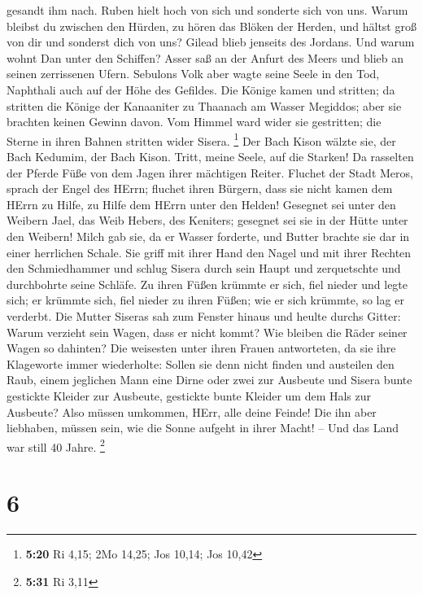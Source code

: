 gesandt ihm nach. Ruben hielt hoch von sich und sonderte sich von uns.
 Warum bleibst du zwischen den Hürden, zu hören das Blöken
der Herden, und hältst groß von dir und sonderst dich von uns?
 Gilead blieb jenseits des Jordans. Und warum wohnt Dan
unter den Schiffen? Asser saß an der Anfurt des Meers und blieb an
seinen zerrissenen Ufern.  Sebulons Volk aber wagte seine
Seele in den Tod, Naphthali auch auf der Höhe des Gefildes.
 Die Könige kamen und stritten; da stritten die Könige der
Kanaaniter zu Thaanach am Wasser Megiddos; aber sie brachten keinen
Gewinn davon.  Vom Himmel ward wider sie gestritten; die
Sterne in ihren Bahnen stritten wider Sisera. \footnote{\textbf{5:20} Ri
  4,15; 2Mo 14,25; Jos 10,14; Jos 10,42}  Der Bach Kison
wälzte sie, der Bach Kedumim, der Bach Kison. Tritt, meine Seele, auf
die Starken!  Da rasselten der Pferde Füße von dem Jagen
ihrer mächtigen Reiter.  Fluchet der Stadt Meros, sprach
der Engel des HErrn; fluchet ihren Bürgern, dass sie nicht kamen dem
HErrn zu Hilfe, zu Hilfe dem HErrn unter den Helden! 
Gesegnet sei unter den Weibern Jael, das Weib Hebers, des Keniters;
gesegnet sei sie in der Hütte unter den Weibern!  Milch gab
sie, da er Wasser forderte, und Butter brachte sie dar in einer
herrlichen Schale.  Sie griff mit ihrer Hand den Nagel und
mit ihrer Rechten den Schmiedhammer und schlug Sisera durch sein Haupt
und zerquetschte und durchbohrte seine Schläfe.  Zu ihren
Füßen krümmte er sich, fiel nieder und legte sich; er krümmte sich, fiel
nieder zu ihren Füßen; wie er sich krümmte, so lag er verderbt.
 Die Mutter Siseras sah zum Fenster hinaus und heulte
durchs Gitter: Warum verzieht sein Wagen, dass er nicht kommt? Wie
bleiben die Räder seiner Wagen so dahinten?  Die weisesten
unter ihren Frauen antworteten, da sie ihre Klageworte immer
wiederholte:  Sollen sie denn nicht finden und austeilen
den Raub, einem jeglichen Mann eine Dirne oder zwei zur Ausbeute und
Sisera bunte gestickte Kleider zur Ausbeute, gestickte bunte Kleider um
dem Hals zur Ausbeute?  Also müssen umkommen, HErr, alle
deine Feinde! Die ihn aber liebhaben, müssen sein, wie die Sonne aufgeht
in ihrer Macht! -- Und das Land war still 40 Jahre. \footnote{\textbf{5:31}
  Ri 3,11}

\hypertarget{section-1}{%
\section{6}\label{section-1}}

